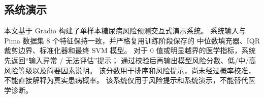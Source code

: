 \subsection{系统演示}

本文基于 Gradio 构建了单样本糖尿病风险预测交互式演示系统。
系统输入与 Pima 数据集 8 个特征保持一致，并严格复用训练阶段保存的
中位数填充器、IQR 裁剪边界、标准化器和最终 SVM 模型。
对于 0 值或明显越界的医学指标，系统先返回“输入异常 / 无法评估”提示；
通过校验后再输出模型风险分数、低/中/高风险等级以及简要因素说明。
该分数用于排序和风险提示，尚未经过概率校准，
不能直接解释为真实患病概率。
该系统仅用于风险提示和系统演示，不能替代医学诊断。
